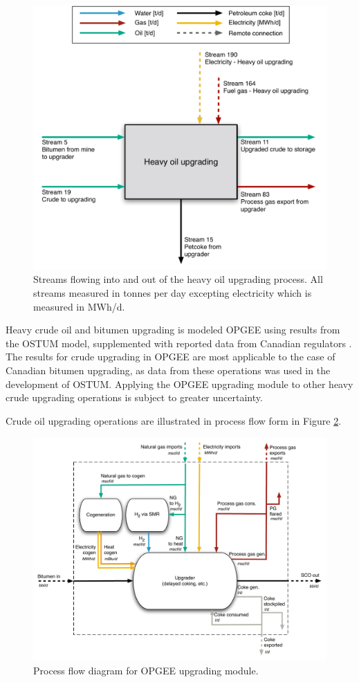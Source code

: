 \documentclass[11pt]{report}
\begin{document}
\begin{figure}
\includegraphics[width=0.85\columnwidth]{images/Heavy_oil_upgrading_PF.pdf}
\caption{Streams flowing into and out of the heavy oil upgrading process. All streams measured in tonnes per day excepting electricity which is measured in MWh/d.}
\label{fig:heavy_oil_upgrading_PF}
\end{figure}


Heavy crude oil and bitumen upgrading is modeled OPGEE using results from the OSTUM model, supplemented with reported data from Canadian regulators \cite{OSTUM2016}. The results for crude upgrading in OPGEE are most applicable to the case of Canadian bitumen upgrading, as data from these operations was used in the development of OSTUM. Applying the OPGEE upgrading module to other heavy crude upgrading operations is subject to greater uncertainty.

Crude oil upgrading operations are illustrated in process flow form in Figure \ref{fig:upgrading}.


\begin{landscape}

\begin{figure}[t]
\includegraphics[width=.8\columnwidth]{images/Upgrading.pdf}
\caption{Process flow diagram for OPGEE upgrading module.}
\label{fig:upgrading}
\end{figure}

\end{landscape}
\end{document}
